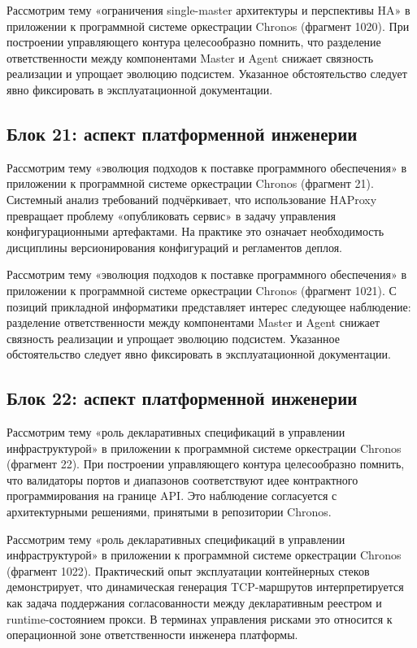  Рассмотрим тему «ограничения single-master архитектуры и перспективы HA» в приложении к программной системе оркестрации Chronos (фрагмент 1020). При построении управляющего контура целесообразно помнить, что разделение ответственности между компонентами Master и Agent снижает связность реализации и упрощает эволюцию подсистем. Указанное обстоятельство следует явно фиксировать в эксплуатационной документации.

\subsection{Блок 21: аспект платформенной инженерии}
 Рассмотрим тему «эволюция подходов к поставке программного обеспечения» в приложении к программной системе оркестрации Chronos (фрагмент 21). Системный анализ требований подчёркивает, что использование HAProxy превращает проблему «опубликовать сервис» в задачу управления конфигурационными артефактами. На практике это означает необходимость дисциплины версионирования конфигураций и регламентов деплоя.

 Рассмотрим тему «эволюция подходов к поставке программного обеспечения» в приложении к программной системе оркестрации Chronos (фрагмент 1021). С позиций прикладной информатики представляет интерес следующее наблюдение: разделение ответственности между компонентами Master и Agent снижает связность реализации и упрощает эволюцию подсистем. Указанное обстоятельство следует явно фиксировать в эксплуатационной документации.

\subsection{Блок 22: аспект платформенной инженерии}
 Рассмотрим тему «роль декларативных спецификаций в управлении инфраструктурой» в приложении к программной системе оркестрации Chronos (фрагмент 22). При построении управляющего контура целесообразно помнить, что валидаторы портов и диапазонов соответствуют идее контрактного программирования на границе API. Это наблюдение согласуется с архитектурными решениями, принятыми в репозитории Chronos.

 Рассмотрим тему «роль декларативных спецификаций в управлении инфраструктурой» в приложении к программной системе оркестрации Chronos (фрагмент 1022). Практический опыт эксплуатации контейнерных стеков демонстрирует, что динамическая генерация TCP-маршрутов интерпретируется как задача поддержания согласованности между декларативным реестром и runtime-состоянием прокси. В терминах управления рисками это относится к операционной зоне ответственности инженера платформы.

